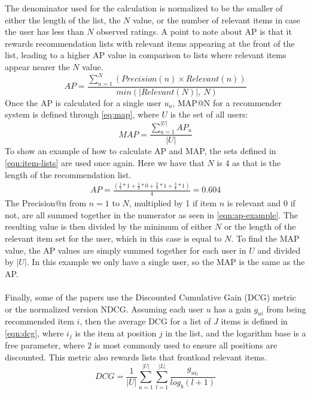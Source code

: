 The denominator used for the calculation is normalized to be the smaller of either the length of the list, the $N$ value, or the number of relevant items in case the user has less than $N$ observed ratings.
A point to note about AP is that it rewards recommendation lists with relevant items appearing at the front of the list, leading to a higher AP value in comparison to lists where relevant items appear nearer the $N$ value. 
\begin{equation}
    \label{eq:averageprecision}
    AP = \frac{\sum\limits_{n=1}^N (Precision(n) \times Relevant(n))}{min(|Relevant(N)|,\:N)}
\end{equation}
Once the AP is calculated for a single user $u_a$, MAP@N for a recommender system is defined through \autoref{eq:map}, where $U$ is the set of all users: 
\begin{equation}
    \label{eq:map}
    MAP = \frac{\sum\limits_{u=1}^{|U|} AP_u}{|U|}
\end{equation}
To show an example of how to calculate AP and MAP, the sets defined in \autoref{eqn:item-lists} are used once again.
Here we have that $N$ is 4 as that is the length of the recommendation list.
\begin{align}
    AP = \frac{(\frac{1}{1}*1+\frac{1}{2}*0+\frac{2}{3}*1+\frac{3}{4}*1)}{4} = 0.604 \label{eqn:ap-example}
\end{align}
The Precision@n from $n=1$ to $N$, multiplied by 1 if item $n$ is relevant and 0 if not, are all summed together in the numerator as seen in \autoref{eqn:ap-example}.
The resulting value is then divided by the minimum of either $N$ or the length of the relevant item set for the user, which in this case is equal to $N$.
To find the MAP value, the AP values are simply summed together for each user in $U$ and divided by $|U|$.
In this example we only have a single user, so the MAP is the same as the AP.
\\\\
Finally, some of the papers use the Discounted Cumulative Gain (DCG) metric or the normalized version NDCG.
Assuming each user $u$ has a gain $g_{ui}$ from being recommended item $i$, then the average DCG for a list of $J$ items is defined in \autoref{eqn:dcg}, where $i_j$ is the item at position $j$ in the list, and the logarithm base is a free parameter, where $2$ is most commonly used to ensure all positions are discounted.
This metric also rewards lists that frontload relevant items.
\begin{equation}
    \label{eqn:dcg}
    DCG = \frac{1}{|U|} \sum\limits_{u=1}^{|U|} \sum\limits_{l = 1}^{|L|} \frac{g_{ui_l}}{log_b (l+1)}
\end{equation}
